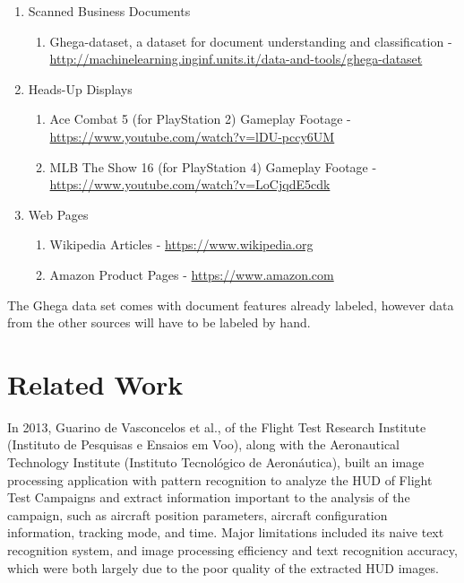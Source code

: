 \documentclass[twoside,10pt]{article}
\theoremstyle{definition}
\theoremstyle{definition}
\theoremstyle{remark}
\renewcommand{\>}{{\rightarrow}}
\newcommand{\1}{{\mathbf 1}}
\newcommand{\0}{{\mathbf 0}}
\begin{document}
\begin{enumerate}
    \item
    Scanned Business Documents
    \begin{enumerate}
        \item
        Ghega-dataset, a dataset for document understanding and classification - \url{http://machinelearning.inginf.units.it/data-and-tools/ghega-dataset}
    \end{enumerate}

    \item
    Heads-Up Displays
    \begin{enumerate}
        \item
        Ace Combat 5 (for PlayStation 2) Gameplay Footage - \url{https://www.youtube.com/watch?v=lDU-pccy6UM}

        \item
        MLB The Show 16 (for PlayStation 4) Gameplay Footage - \url{https://www.youtube.com/watch?v=LoCjqdE5cdk}
    \end{enumerate}

    \item
    Web Pages
    \begin{enumerate}
        \item
        Wikipedia Articles - \url{https://www.wikipedia.org}

        \item
        Amazon Product Pages - \url{https://www.amazon.com}

    \end{enumerate}
\end{enumerate}

The Ghega data set comes with document features already labeled, however data from the other sources will have to be labeled by hand.


\section{Related Work}

In 2013, Guarino de Vasconcelos et al., of the Flight Test Research Institute (Instituto de Pesquisas e Ensaios em Voo), along with the Aeronautical Technology Institute (Instituto Tecnológico de Aeronáutica), built an image processing application with pattern recognition to analyze the HUD of Flight Test Campaigns and extract information important to the analysis of the campaign, such as aircraft position parameters, aircraft configuration information, tracking mode, and time. Major limitations included its naive text recognition system, and image processing efficiency and text recognition accuracy, which were both largely due to the poor quality of the extracted HUD images.
\end{document}
